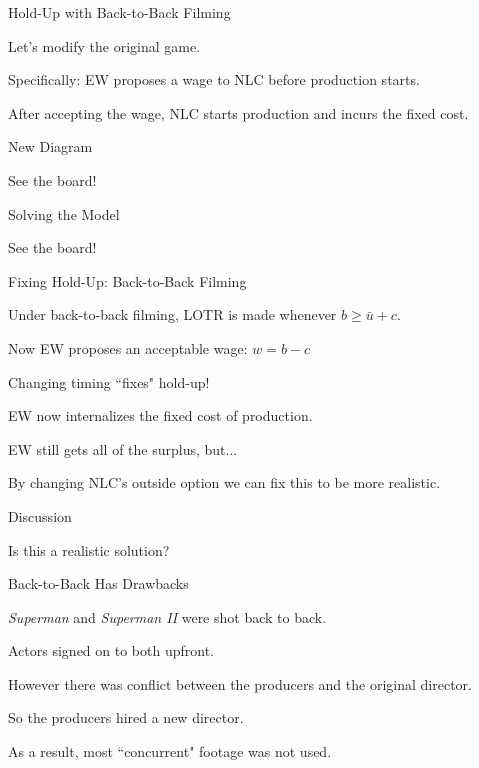 \documentclass[aspectratio=169,usenames,dvipsnames]{beamer}
\newenvironment{wideitemize}{\itemize\addtolength{\itemsep}{10pt}}{\enditemize}
\begin{document}
\begin{frame}{Hold-Up with Back-to-Back Filming}
\begin{wideitemize}
    \item Let's modify the original game.
    \item Specifically: EW proposes a wage to NLC before production starts.
    \item After accepting the wage, NLC starts production and incurs the fixed cost.
\end{wideitemize}
\end{frame}


\begin{frame}{New Diagram}

    \huge See the board!

    
\end{frame}


\begin{frame}{Solving the Model}

    \huge See the board!

    
\end{frame}


\begin{frame}{Fixing Hold-Up: Back-to-Back Filming}

\begin{theorem}
Under back-to-back filming, LOTR is made whenever $b\geq \bar u +c$.
\end{theorem}

    \begin{wideitemize}
        \item Now EW proposes an acceptable wage: $w=b-c$
        \item Changing timing ``fixes" hold-up!
        \item EW now internalizes the fixed cost of production.
        \item EW still gets all of the surplus, but...
        \item By changing NLC's outside option we can fix this to be more realistic.
    \end{wideitemize}
\end{frame}



\begin{frame}{Discussion}

    \huge Is this a realistic solution?

    
\end{frame}


\begin{frame}{Back-to-Back Has Drawbacks}
\begin{wideitemize}
    \item \textit{Superman} and \textit{Superman II} were shot back to back.
    \item Actors signed on to both upfront.
    \item However there was conflict between the producers and the original director.
    \item So the producers hired a new director.
    \item As a result, most ``concurrent" footage was not used.
\end{wideitemize}
\end{frame}
\end{document}
